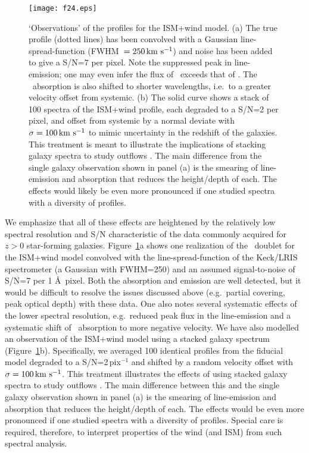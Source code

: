 \documentclass[]{emulateapj}
\begin{document}
\begin{figure}
\texttt{[image: f24.eps]}
\caption{
`Observations' of the  profiles for the ISM+wind model.  
(a) The true profile (dotted lines) has been convolved with a
Gaussian line-spread-function (FWHM~$= 250 \, {\rm km~s^{-1}}$) and noise has been
added to give a S/N=7 per pixel.  Note the suppressed peak in 
line-emission; one may even infer the flux of \mgiia\ exceeds that of
\mgiib.  The \mgiia\ absorption is also shifted to
shorter wavelengths, i.e.\ to a greater velocity offset from systemic.  
(b) The solid curve shows a stack of 100 spectra of the ISM+wind
profile, each degraded to a S/N=2 per pixel, and offset from systemic
by a normal deviate with $\sigma = 100 \, {\rm km~s^{-1}}$ to mimic uncertainty in
the redshift of the galaxies.  
This treatment is meant to illustrate the
implications of stacking galaxy spectra to study outflows
\citep[e.g.][S10]{wcp+09,rwk+10}.   The main difference from the
single galaxy observation shown in panel (a) is the smearing of
line-emission and absorption that reduces the height/depth of each.
The effects would likely be even more pronounced if one studied spectra with
a diversity of  profiles.    
}
\label{fig:obs_lris}
\end{figure}


We emphasize that all of these effects are heightened by the
relatively low spectral resolution and S/N characteristic of the data
commonly acquired for $z>0$ star-forming galaxies.  Figure~\ref{fig:obs_lris}a
shows one realization of the \mgiid\ doublet for the ISM+wind model
convolved with the line-spread-function of the Keck/LRIS spectrometer
(a Gaussian with FWHM=250\kms) and an assumed signal-to-noise of
S/N=7 per 1 \AA\ pixel.  Both the absorption
and emission are well detected, but it would be
difficult to resolve the issues discussed above (e.g.\ partial
covering, peak optical depth) with these data.  
One also notes several systematic effects of the lower spectral
resolution, e.g.\ reduced peak flux in the line-emission and a
systematic shift of \mgiia\ absorption to more negative velocity.
We have also modelled an observation of the ISM+wind model using
a stacked galaxy spectrum (Figure~\ref{fig:obs_lris}b).
Specifically, we
averaged 100 identical  profiles from the fiducial model
degraded to a S/N=2\,pix$^{-1}$ and shifted by a random velocity
offset with $\sigma = 100\, {\rm km~s^{-1}}$.  
This treatment illustrates the effects of using stacked galaxy 
spectra to study outflows
\citep[e.g.][S10]{wcp+09,rwk+10}.   The main difference %
between this and 
the
single galaxy observation shown in panel (a) is the smearing of
line-emission and absorption that reduces the height/depth of each.
The effects would be even more pronounced if one studied spectra with
a diversity of  profiles.    
Special care is required, therefore, to interpret properties of the wind (and
ISM) from such spectral analysis.
\end{document}
